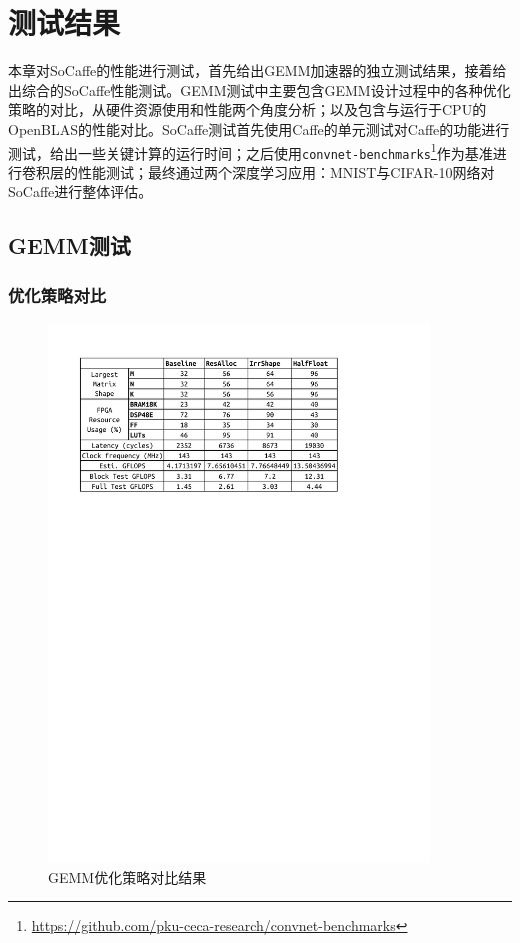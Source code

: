 \chapter{测试结果}

本章对SoCaffe的性能进行测试，首先给出GEMM加速器的独立测试结果，接着给出综合的SoCaffe性能测试。GEMM测试中主要包含GEMM设计过程中的各种优化策略的对比，从硬件资源使用和性能两个角度分析；以及包含与运行于CPU的OpenBLAS的性能对比。SoCaffe测试首先使用Caffe的单元测试对Caffe的功能进行测试，给出一些关键计算的运行时间；之后使用\texttt{convnet-benchmarks}\footnote{\url{https://github.com/pku-ceca-research/convnet-benchmarks}}作为基准进行卷积层的性能测试；最终通过两个深度学习应用：MNIST与CIFAR-10网络对SoCaffe进行整体评估。

\section{GEMM测试}

\subsection{优化策略对比}

\begin{figure}[!ht]
\centering	
\includegraphics[width=0.9\textwidth]{assets/imgs/gemmopt.pdf}
\caption{GEMM优化策略对比结果}
\label{fig:gemmopt}
\end{figure}

